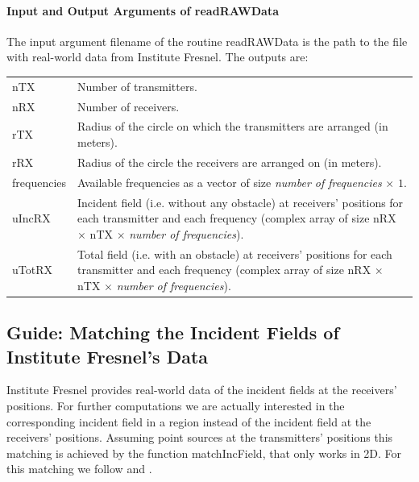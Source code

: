 \documentclass[a4paper]{article}
\begin{document}
\paragraph{Input and Output Arguments of \textsf{readRAWData}} The input argument \textsf{filename} of the routine \textsf{readRAWData} is the path to the file with real-world data from Institute Fresnel. The outputs are:

\noindent\begin{tabular}[t]{p{1.6cm} p{14cm}}
 \textsf{nTX} & Number of transmitters.\\
 \textsf{nRX} & Number of receivers.\\
 \textsf{rTX} & Radius of the circle on which the transmitters are arranged (in meters).\\
 \textsf{rRX} & Radius of the circle the receivers are arranged on (in meters).\\
 \textsf{frequencies} & Available frequencies as a vector of size \emph{number of frequencies} $\times$ $1$.\\
 \textsf{uIncRX} & Incident field (i.e. without any obstacle) at receivers' positions for each transmitter and each frequency (complex array of size \textsf{nRX} $\times$ \textsf{nTX} $\times$ \emph{number of frequencies}).\\
 \textsf{uTotRX} & Total field (i.e. with an obstacle) at receivers' positions for each transmitter and each frequency (complex array of size \textsf{nRX} $\times$ \textsf{nTX} $\times$ \emph{number of frequencies}).
\end{tabular}


\subsection{Guide: Matching the Incident Fields of Institute Fresnel's Data}\label{sec:guide:matchIncField}

Institute Fresnel provides real-world data of the incident fields at the receivers' positions. For further computations we are actually interested in the corresponding incident field in a region instead of the incident field at the receivers' positions. Assuming point sources at the transmitters' positions this matching is achieved by the function \textsf{matchIncField}, that only works in 2D. For this matching we follow \cite[Sec.~6.2.2]{Gehre2013} and \cite[Sec.~6]{Buergel2017}.
\end{document}

